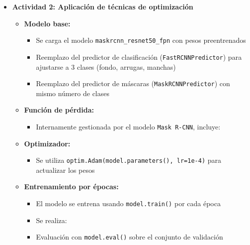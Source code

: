 \begin{enumerate}
\begin{itemize}
\begin{itemize}
    \end{itemize}
  
    \item \textbf{Actividad 2: Aplicación de técnicas de optimización}
    \begin{itemize}
      \item \textbf{Modelo base:}
      \begin{itemize}
        \item Se carga el modelo \texttt{maskrcnn\_resnet50\_fpn} con pesos preentrenados
        \item Reemplazo del predictor de clasificación (\texttt{FastRCNNPredictor}) para ajustarse a 3 clases (fondo, arrugas, manchas)
        \item Reemplazo del predictor de máscaras (\texttt{MaskRCNNPredictor}) con mismo número de clases
      \end{itemize}
  
      \item \textbf{Función de pérdida:}
      \begin{itemize}
        \item Internamente gestionada por el modelo \texttt{Mask R-CNN}, incluye:
      \end{itemize}
  
      \item \textbf{Optimizador:}
      \begin{itemize}
        \item Se utiliza \texttt{optim.Adam(model.parameters(), lr=1e-4)} para actualizar los pesos
      \end{itemize}
  
      \item \textbf{Entrenamiento por épocas:}
      \begin{itemize}
        \item El modelo se entrena usando \texttt{model.train()} por cada época
        \item Se realiza:
        \item Evaluación con \texttt{model.eval()} sobre el conjunto de validación
      \end{itemize}
  

\end{itemize}
\end{itemize}
\end{enumerate}
